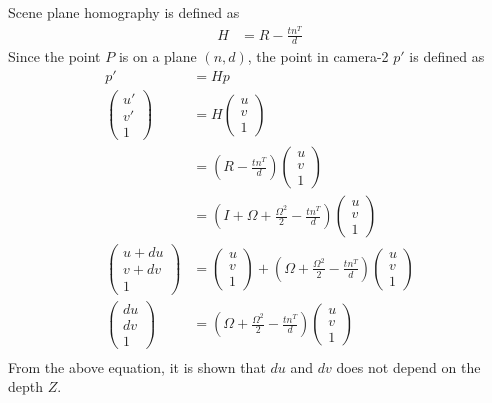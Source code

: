 \documentclass{article}
\begin{document}
\subsubsection{}
Scene plane homography is defined as
\begin{align*}
H &= R - \frac{t n^T}{d}
\end{align*}
Since the point $P$ is on a plane $(n, d)$, the point in camera-2 $p'$ is defined as
\begin{align*}
p' &= H p \\
\begin{pmatrix} u'\\ v'\\ 1 \end{pmatrix} &= H \begin{pmatrix} u\\ v\\ 1 \end{pmatrix} \\
&= (R - \frac{t n^T}{d}) \begin{pmatrix} u\\ v\\ 1 \end{pmatrix} \\
&= (I + \Omega + \frac{\Omega^2}{2} - \frac{t n^T}{d}) \begin{pmatrix} u\\ v\\ 1 \end{pmatrix} \\
\begin{pmatrix} u + du\\ v + dv\\ 1 \end{pmatrix} &= \begin{pmatrix} u\\ v\\ 1 \end{pmatrix} + (\Omega + \frac{\Omega^2}{2} - \frac{t n^T}{d}) \begin{pmatrix} u\\ v\\ 1 \end{pmatrix} \\
\begin{pmatrix} du\\  dv\\ 1 \end{pmatrix} &= (\Omega + \frac{\Omega^2}{2} - \frac{t n^T}{d}) \begin{pmatrix} u\\ v\\ 1 \end{pmatrix} \\
\end{align*}
From the above equation, it is shown that $du$ and $dv$ does not depend on the depth $Z$.
\end{document}
